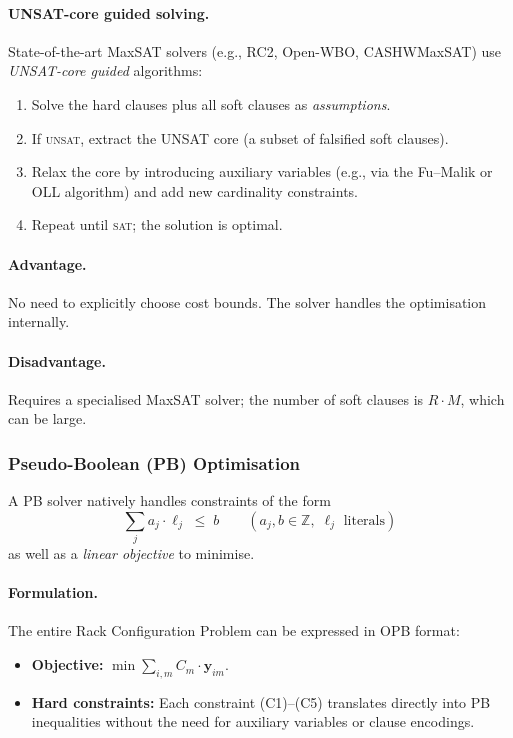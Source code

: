 \documentclass[11pt,a4paper]{article}
\begin{document}
\paragraph{UNSAT-core guided solving.}
State-of-the-art MaxSAT solvers (e.g., RC2, Open-WBO, CASHWMaxSAT)
use \emph{UNSAT-core guided} algorithms:
\begin{enumerate}
  \item Solve the hard clauses plus all soft clauses as
        \emph{assumptions}.
  \item If \textsc{unsat}, extract the UNSAT core
        (a subset of falsified soft clauses).
  \item Relax the core by introducing auxiliary variables
        (e.g., via the Fu--Malik or OLL algorithm)
        and add new cardinality constraints.
  \item Repeat until \textsc{sat}; the solution is optimal.
\end{enumerate}

\paragraph{Advantage.}
No need to explicitly choose cost bounds.
The solver handles the optimisation internally.

\paragraph{Disadvantage.}
Requires a specialised MaxSAT solver; the number of soft clauses
is $R \cdot M$, which can be large.

\subsubsection{Pseudo-Boolean (PB) Optimisation}
\label{sec:opt-pb}

A PB solver natively handles constraints of the form
\[
  \sum_{j} a_j \cdot \ell_j \;\le\; b
  \qquad (a_j, b \in \mathbb{Z},\; \ell_j \text{ literals})
\]
as well as a \emph{linear objective} to minimise.

\paragraph{Formulation.}
The entire Rack Configuration Problem can be expressed in
OPB format:

\begin{itemize}
  \item \textbf{Objective:}
        $\min \sum_{i,m} C_m \cdot \mathbf{y}_{im}$.
  \item \textbf{Hard constraints:}
        Each constraint (C1)--(C5) translates directly into
        PB inequalities without the need for auxiliary variables
        or clause encodings.
\end{itemize}
\end{document}
